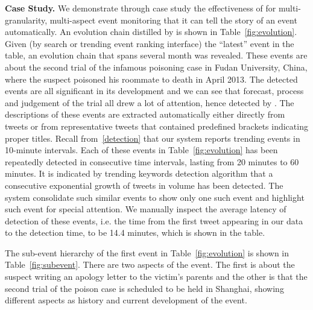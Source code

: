 
\noindent\textbf{Case Study.}
\label{casestudy}
We demonstrate through case study the effectiveness of \ring for multi-granularity, multi-aspect event monitoring that it can tell the story of an event automatically.
An evolution chain distilled by \ring is shown in Table~\ref{fig:evolution}.
Given (by search or trending event ranking interface) the ``latest'' event in the table, an evolution chain that spans several month was revealed.
These events are about the second trial of the infamous poisoning case in Fudan University, China,
where the suspect poisoned his roommate to death in April 2013.
The detected events are all significant in its development and we can see that forecast, process and judgement of the trial all drew a lot of attention, hence detected by \ring.
The descriptions of these events are extracted automatically either directly from tweets or from representative tweets that contained predefined brackets indicating proper titles.
Recall from~\ref{detection} that our system reports trending events in 10-minute intervals.
Each of these events in Table~\ref{fig:evolution} has been repeatedly detected in consecutive time intervals, lasting from 20 minutes to 60 minutes.
It is indicated by trending keywords detection algorithm that a consecutive exponential growth of tweets in volume has been detected.
The system consolidate such similar events to show only one such event and highlight such event for special attention.
We manually inspect the average latency of detection of these events, i.e. the time from the first tweet appearing in our data to the detection time, to be 14.4 minutes, which is shown in the table.

The sub-event hierarchy of the first event in Table~\ref{fig:evolution} is shown in Table~\ref{fig:subevent}.
There are two aspects of the event.
The first is about the suspect writing an apology letter to the victim's parents and the other is that the second trial of the poison case is scheduled to be held in Shanghai, showing different aspects as history and current development of the event.

